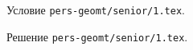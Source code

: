 \problem
Условие \texttt{pers-geomt/senior/1.tex}.

\solution Решение \texttt{pers-geomt/senior/1.tex}.
\endproblem
